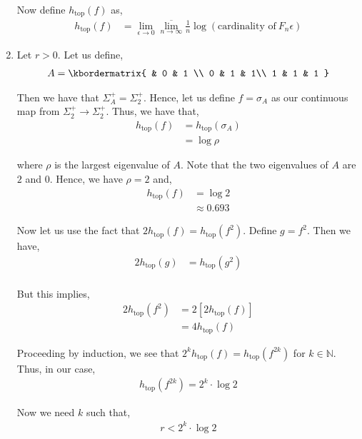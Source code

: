 \documentclass[12pt]{article}
\begin{document}
\begin{enumerate}[label=(\alph*)]
Now define $h_{\text{top}}(f)$ as,
\begin{align*}
h_{\text{top}}(f) &= \lim_{\epsilon \to 0} \overline{\lim_{n \to \infty}} \frac{1}{n} \log \left(\text{cardinality of} \ F_n{\epsilon}\right)
\end{align*}

\item Let $r > 0$. Let us define,
\begin{align*}
A =  \kbordermatrix{
    & 0 & 1  \\
    0 & 1 & 1\\
    1 & 1 & 1
  }
\end{align*}

Then we have that $\Sigma^+_A = \Sigma^+_2$. Hence, let us define $f = \sigma_A$ as our continuous map from $\Sigma^+_2 \to \Sigma_2^+$. Thus, we have that,
\begin{align*}
h_{\text{top}}(f) &= h_{\text{top}}(\sigma_A)\\
&= \log \rho
\end{align*}

where $\rho$ is the largest eigenvalue of $A$. Note that the two eigenvalues of $A$ are $2$ and $0$. Hence, we have $\rho = 2$ and,
\begin{align*}
h_{\text{top}}(f) &= \log 2\\
&\approx 0.693
\end{align*}

Now let us use the fact that $2h_{\text{top}}(f) = h_{\text{top}}(f^2)$. Define $g = f^2$. Then we have,
\begin{align*}
2h_{\text{top}}(g) &= h_{\text{top}}(g^2)\\
\end{align*}

But this implies,
\begin{align*}
2h_{\text{top}}(f^2) &= 2[2h_{\text{top}}(f)]\\
&= 4h_{\text{top}}(f)
\end{align*}

Proceeding by induction, we see that $2^kh_{\text{top}}(f) = h_{\text{top}}(f^{2k})$ for $k \in \mathbb{N}$. Thus, in our case, 
\begin{align*}
 h_{\text{top}}(f^{2k}) = 2^k \cdot \log 2
\end{align*}

Now we need $k$ such that,
\begin{align*}
r < 2^k \cdot \log 2
\end{align*}


\end{enumerate}
\end{document}
